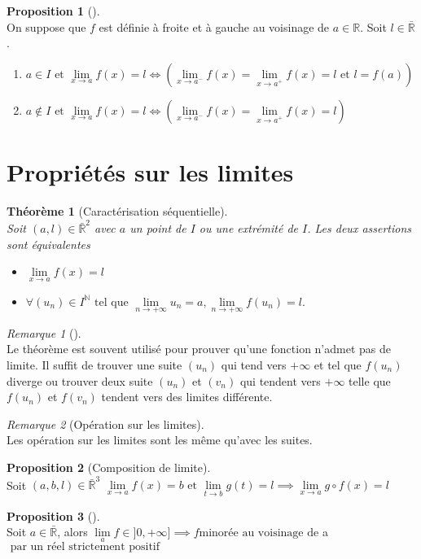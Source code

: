 \documentclass{article}
\newcommand{\R}{\mathbb{R}}
\newcommand{\N}{\mathbb{N}}
\newcommand{\et}{\text{ et }}
\newcommand{\tq}{\text{ tel que }}
\newcommand{\lm}{\lim\limits}
\newcommand{\voi}[1]{\text{ au voisinage de }$#1$}
\theoremstyle{definition}
\newtheorem*{prop}{Proposition}
\theoremstyle{remark}
\newtheorem*{rema}{Remarque}
\theoremstyle{plain}
\newtheorem*{them}{Théorème}
\newenvironment{prp}[1][]
{\begin{prop}[#1]\quad\\}
{\end{prop}}
\newenvironment{rem}[1][]
{\begin{rema}[#1]\quad\\}
{\end{rema}}
\newenvironment{thm}[1][]
{\begin{them}[#1]\quad\\}
{\end{them}}
\begin{document}
\begin{prp} 
On suppose que $f$ est définie à froite et à gauche au voisinage de
$a \in \R$. Soit $l \in \bar{\R}$.
\begin{enumerate}
    \item $a \in I \et \lm_{x \to a} f(x) = l \iff
    (\lm_{x \to a^-} f(x) = \lm_{x \to a^+} f(x) = l \et l = f(a))$
    \item $a \notin I \et \lm_{x \to a} f(x) = l \iff
    (\lm_{x \to a^-} f(x) = \lm_{x \to a^+} f(x) = l)$
\end{enumerate}
\end{prp}

\section{Propriétés sur les limites}
\begin{thm}[Caractérisation séquentielle]
Soit $(a, l) \in \bar{\R}^2$ avec $a$ un point de $I$ ou une extrémité
de $I$. Les deux assertions sont équivalentes
\begin{itemize}
    \item $\lm_{x \to a} f(x) = l$ 
    \item $\forall (u_n) \in I^\N \tq \lm_{n \to +\infty} u_n = a,
    \lm_{n \to +\infty} f(u_n) = l.$
\end{itemize}
\end{thm}

\begin{rem}
Le théorème est souvent utilisé pour prouver qu'une fonction n'admet pas
de limite.
Il suffit de trouver une suite $(u_n)$ qui tend vers $+\infty$ et tel
que $f(u_n)$ diverge ou trouver deux suite $(u_n)$ et $(v_n)$
qui tendent vers $+\infty$ telle que $f(u_n)$ et $f(v_n)$ tendent vers des
limites différente.
\end{rem}
 
\begin{rem}[Opération sur les limites]
Les opération sur les limites sont les même qu'avec les suites.
\end{rem}

\begin{prp}[Composition de limite] 
Soit $(a, b, l) \in \bar{\R}^3$
$\lm_{x \to a} f(x) = b \et \lm_{t \to b} g(t) = l
\implies \lm_{x \to a} g \circ f(x) = l$
\end{prp}

\begin{prp} 
Soit $a \in \bar{\R}$, alors
$\lm_{a} f \in ]0, +\infty] \implies f \text{minorée} \voi{a}
\text{ par un réel strictement positif}$
\end{prp}
\end{document}

